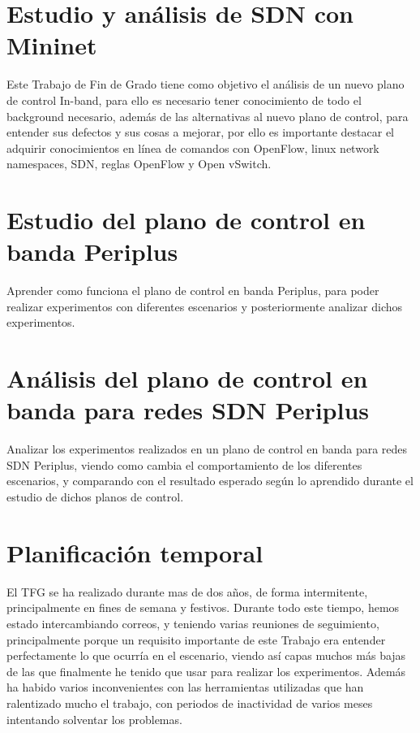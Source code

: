 \documentclass[a4paper, 12pt]{book}
\begin{document}
	\section{Estudio y análisis de SDN con Mininet} %
	\label{sec:objetivo-mininet} %
	
	Este Trabajo de Fin de Grado tiene como objetivo el análisis de un nuevo plano de control In-band, para ello es necesario tener conocimiento de todo el background necesario, además de las alternativas al nuevo plano de control, para entender sus defectos y sus cosas a mejorar, por ello es importante destacar el adquirir conocimientos en línea de comandos con OpenFlow, linux network namespaces, SDN, reglas OpenFlow y Open vSwitch.
	
	
	\section{Estudio del plano de control en banda Periplus}
	\label{sec:objetivos-periplus}
	
	Aprender como funciona el plano de control en banda Periplus, para poder realizar experimentos con diferentes escenarios y posteriormente analizar dichos experimentos.
	
	\section{Análisis del plano de control en banda para redes SDN Periplus}
	
	Analizar los experimentos realizados en un plano de control en banda para redes SDN Periplus, viendo como cambia el comportamiento de los diferentes escenarios, y comparando con el resultado esperado según lo aprendido durante el estudio de dichos planos de control.
	\label{sec:objetivos-analisis-periplus}
	
	\section{Planificación temporal}
	\label{sec:planificacion-temporal}
	
	El TFG se ha realizado durante mas de dos años, de forma intermitente, principalmente en fines de semana y festivos. Durante todo este tiempo, hemos estado intercambiando correos, y teniendo varias reuniones de seguimiento, principalmente porque un requisito importante de este Trabajo era entender perfectamente lo que ocurría en el escenario, viendo así capas muchos más bajas de las que finalmente he tenido que usar para realizar los experimentos.
	Además ha habido varios inconvenientes con las herramientas utilizadas que han ralentizado mucho el trabajo, con periodos de inactividad de varios meses intentando solventar los problemas.
	
\end{document}
